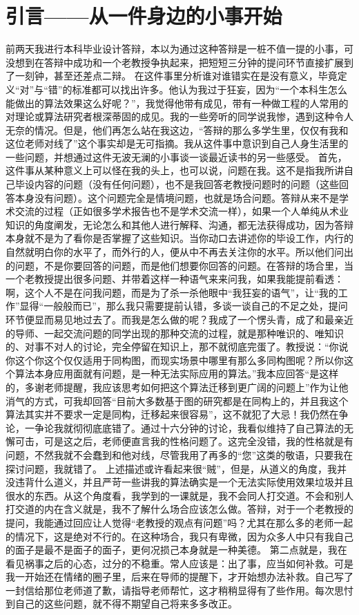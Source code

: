 \documentclass[10pt,a4paper]{article}
\title{}
\author{梁子}
\date{\textit{<2020-06-17 周三>}}
\title{}
\begin{document}
\tableofcontents


\section{引言——从一件身边的小事开始}
\label{sec:org6a9a8b6}
前两天我进行本科毕业设计答辩，本以为通过这种答辩是一桩不值一提的小事，可没想到在答辩中成功和一个老教授争执起来，把短短三分钟的提问环节直接扩展到了一刻钟，甚至还差点二辩。
在这件事里分析谁对谁错实在是没有意义，毕竟定义“对”与“错”的标准都可以找出许多。他认为我过于狂妄，因为“一个本科生怎么能做出的算法效果这么好呢？”，我觉得他带有成见，带有一种做工程的人常用的对理论或算法研究者根深蒂固的成见。我的一些旁听的同学说我惨，遇到这种令人无奈的情况。但是，他们再怎么站在我这边，“答辩的那么多学生里，仅仅有我和这位老师对线了”这个事实却是无可指摘。我从这件事中意识到自己人身生活里的一些问题，并想通过这件无波无澜的小事谈一谈最近读书的另一些感受。
首先，这件事从某种意义上可以怪在我的头上，也可以说，问题在我。这不是指我所讲自己毕设内容的问题（没有任何问题），也不是我回答老教授问题时的问题（这些回答本身没有问题）。这个问题完全是情境问题，也就是场合问题。答辩从来不是学术交流的过程（正如很多学术报告也不是学术交流一样），如果一个人单纯从术业知识的角度阐发，无论怎么和其他人进行解释、沟通，都无法获得成功，因为答辩本身就不是为了看你是否掌握了这些知识。当你动口去讲述你的毕设工作，内行的自然就明白你的水平了，而外行的人，便从中不再去关注你的水平。所以他们问出的问题，不是你要回答的问题，而是他们想要你回答的问题。在答辩的场合里，当一个老教授提出很多问题、并带着这样一种语气来来问我，如果我能提前看透：啊，这个人不是在问我问题，而是为了杀一杀他眼中“我狂妄的语气”，让“我的工作”显得“一般般而已”，那么我只需要提前认错，多谈一谈自己的不足之处，提问环节便显而易见地过去了。而我是怎么做的呢？我成了一个愣头青，成了和最亲近的导师、一起交流问题的同学出现的那种交流的过程，就是那种唯识的、唯知识的、对事不对人的讨论，完全停留在知识上，那不就彻底完蛋了。教授说：“你说你这个你这个仅仅适用于同构图，而现实场景中哪里有那么多同构图呢？所以你这个算法本身应用面就有问题，是一种无法实际应用的算法。”我本应回答“是这样的，多谢老师提醒，我应该思考如何把这个算法迁移到更广阔的问题上”作为让他消气的方式，可我却回答“目前大多数基于图的研究都是在同构上的，并且我这个算法其实并不要求一定是同构，迁移起来很容易”，这不就犯了大忌！我仍然在争论，一争论我就彻彻底底错了。通过十六分钟的讨论，我看似维持了自己算法的无懈可击，可是这之后，老师便直言我的性格问题了。这完全没错，我的性格就是有问题，不然我就不会蠢到和他对线，尽管我用了再多的“您”这类的敬语，只要我在探讨问题，我就错了。
上述描述或许看起来很“贼”，但是，从道义的角度，我并没违背什么道义，并且严苛一些讲我的算法确实是一个无法实际使用效果垃圾并且很水的东西。从这个角度看，我学到的一课就是，我不会同人打交道。不会和别人打交道的内在含义就是，我不了解什么场合应该怎么做。答辩，对于一个老教授的提问，我能通过回应让人觉得“老教授的观点有问题”吗？尤其在那么多的老师一起的情况下，这是绝对不行的。在这种场合，我只有卑微，因为众多人中只有我自己的面子是最不是面子的面子，更何况损己本身就是一种美德。
第二点就是，我在看见祸事之后的心态，过分的不稳重。常人应该是：出了事，应当如何补救。可是我一开始还在情绪的圈子里，后来在导师的提醒下，才开始想办法补救。自己写了一封信给那位老师道了歉，请指导老师帮忙，这才稍稍显得有了些作用。每次思忖到自己的这些问题，就不得不期望自己将来多多改正。
\end{document}
